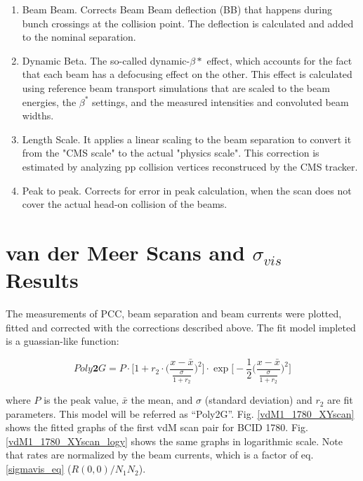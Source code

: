 \begin{enumerate}
\item Beam Beam. Corrects Beam Beam deflection (BB) that happens during bunch crossings at the collision point. The deflection is calculated and added to the nominal separation.

\item Dynamic Beta. The so-called dynamic-$\beta*$ effect, which accounts for the fact that each beam has a defocusing effect on the other. This effect is calculated using reference beam transport simulations that are scaled to the beam energies, the  $\beta ^{*}$ settings, and the measured intensities and convoluted beam widths. %

\item Length Scale.  It applies a linear scaling to the beam separation to convert it from the "CMS scale" to the actual "physics scale". This correction is estimated by analyzing pp collision vertices reconstruced by the CMS tracker. %

\item Peak to peak. Corrects for error in peak calculation, when the scan does not cover the actual head-on collision of the beams. %

\end{enumerate}


\section{van der Meer Scans and $\sigma_{vis}$ Results}

The measurements of PCC, beam separation and beam currents were plotted, fitted and corrected with the corrections described above. The fit model impleted is a guassian-like function: 

$$Poly\mathbf{2}G= P \cdot \Biggl[1+r_{2} \cdot \Biggl( \frac{x-\bar{x}}{\frac{\sigma}{1+r_{2}}} \Biggr)^{2}   \Biggr]\cdot \exp \Biggl[ - \frac{1}{2} \Biggl(  \frac{x-\bar{x}}{ \frac{\sigma}{1+r_{2}} }  \Biggr)^{2} \Biggr] $$

where $P$ is the peak value, $\bar{x}$ the mean, and $\sigma$ (standard deviation) and $r_{2}$ are fit parameters. This model will be referred as ``Poly2G''. Fig. \ref{vdM1_1780_XYscan} shows the fitted graphs of the first vdM scan pair for BCID 1780. Fig. \ref{vdM1_1780_XYscan_logy} shows the same graphs in logarithmic scale. Note that rates are normalized by the beam currents, which is a factor of eq. \ref{sigmavis_eq}  ($R(0,0)/N_{1}N_{2}$).

